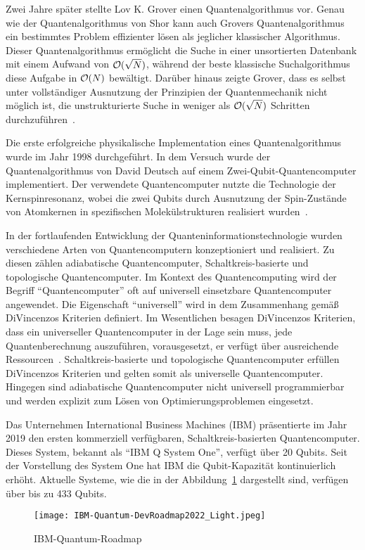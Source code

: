 Zwei Jahre später stellte Lov K. Grover einen Quantenalgorithmus vor.
Genau wie der Quantenalgorithmus von Shor kann auch Grovers Quantenalgorithmus ein bestimmtes Problem effizienter lösen als jeglicher klassischer Algorithmus.
Dieser Quantenalgorithmus ermöglicht die Suche in einer unsortierten Datenbank mit einem Aufwand von \(\operatorname{\mathcal{O}}(\sqrt N)\), 
während der beste klassische Suchalgorithmus diese Aufgabe in \(\operatorname{\mathcal{O}}(N)\) bewältigt. 
Darüber hinaus zeigte Grover, 
dass es selbst unter vollständiger Ausnutzung der Prinzipien der Quantenmechanik nicht möglich ist, 
die unstrukturierte Suche in weniger als \(\operatorname{\mathcal{O}}(\sqrt N)\) Schritten durchzuführen~\cite{grover1996fast}.

Die erste erfolgreiche physikalische Implementation eines Quantenalgorithmus wurde im Jahr 1998 durchgeführt.
In dem Versuch wurde der Quantenalgorithmus von David Deutsch auf einem Zwei-Qubit-Quantencomputer implementiert.
Der verwendete Quantencomputer nutzte die Technologie der Kernspinresonanz, 
wobei die zwei Qubits durch Ausnutzung der Spin-Zustände von Atomkernen in spezifischen Molekülstrukturen realisiert wurden~\cite{Jones_1998}.

In der fortlaufenden Entwicklung der Quanteninformationstechnologie wurden verschiedene Arten von Quantencomputern konzeptioniert und realisiert.
Zu diesen zählen adiabatische Quantencomputer, Schaltkreis-basierte und topologische Quantencomputer.
Im Kontext des Quantencomputing wird der Begriff "`Quantencomputer"' oft auf universell einsetzbare Quantencomputer angewendet.
Die Eigenschaft "`universell"' wird in dem Zusammenhang gemäß DiVincenzos Kriterien definiert. 
Im Wesentlichen besagen DiVincenzos Kriterien, dass ein universeller Quantencomputer in der Lage sein muss, jede Quantenberechnung auszuführen, vorausgesetzt, er verfügt über ausreichende Ressourcen~\cite{DiVincenzo_2000}.
Schaltkreis-basierte und topologische Quantencomputer erfüllen DiVincenzos Kriterien und gelten somit als universelle Quantencomputer.
Hingegen sind adiabatische Quantencomputer nicht universell programmierbar und werden explizit zum Lösen von Optimierungsproblemen eingesetzt.

Das Unternehmen International Business Machines (IBM) präsentierte im Jahr 2019 den ersten kommerziell verfügbaren, Schaltkreis-basierten Quantencomputer.
Dieses System, bekannt als "`IBM Q System One"', verfügt über 20 Qubits.
Seit der Vorstellung des System One hat IBM die Qubit-Kapazität kontinuierlich erhöht. 
Aktuelle Systeme, wie die in der Abbildung~\ref{fig:IBM-Quantum-DevRoadmap2022} dargestellt sind, verfügen über bis zu 433 Qubits.
\begin{figure} [H]
\caption{IBM-Quantum-Roadmap~\cite{IBM_2023}}
\label{fig:IBM-Quantum-DevRoadmap2022}
\texttt{[image: IBM-Quantum-DevRoadmap2022\_Light.jpeg]}
\centering
\end{figure}

